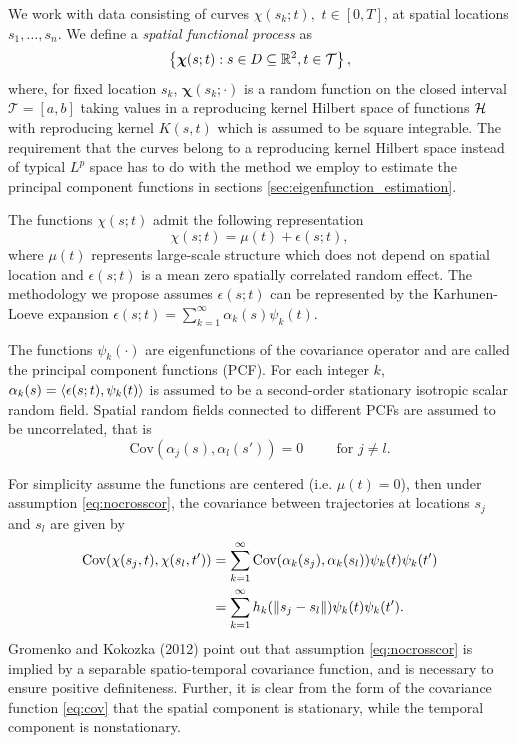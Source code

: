 \label{sec:statistical_model_for_spatially_indexed_functional_data}

We work with data consisting of curves $\chi(s_k; t),$ $t \in [0,T]$, at spatial locations $s_1, \dots, s_n$. We define a \emph{spatial functional process} as
\[ \left\{ \boldsymbol\chi(s; t): s \in D \subseteq  \mathbb{R} ^2, t \in \mathcal{T} \right\}, \]
where, for fixed location $s_k$, $\boldsymbol\chi(s_k; \cdot)$ is a random function on the closed interval $\mathcal{T} = [a,b]$ taking values in a reproducing kernel Hilbert space of functions $\mathcal{H}$ with reproducing kernel $K(s,t)$ which is assumed to be square integrable. The requirement that the curves belong to a reproducing kernel Hilbert space instead of typical $L^p$ space has to do with the method we employ to estimate the principal component functions in sections \ref{sec:eigenfunction_estimation}.

The functions $\chi(s;t)$ admit the following representation 
\begin{equation}
	\chi(s;t) = \mu(t) + \epsilon(s;t), 
\end{equation}
where $\mu(t)$ represents large-scale structure which does not depend on spatial location and $\epsilon(s;t)$ is a mean zero spatially correlated random effect. The methodology we propose assumes $\epsilon(s;t)$ can be represented by the Karhunen-Loeve expansion $\epsilon(s;t) = \sum_{k=1}^{\infty} \alpha_k(s)\psi_k(t)$.

The functions $\psi_k(\cdot)$ are eigenfunctions of the covariance operator and are called the principal component functions (PCF). For each integer $k$, $\alpha_k(s) = \langle \epsilon(s;t),  \psi_k(t) \rangle$ is assumed to be a second-order stationary isotropic scalar random field. Spatial random fields connected to different PCFs are assumed to be uncorrelated, that is 
\begin{equation}
	\text{Cov}(\alpha_j(s), \alpha_l(s')) = 0 \hspace{1cm} \text{for } j \neq l. \label{eq:nocrosscor} 
\end{equation}

For simplicity assume the functions are centered (i.e. $\mu(t)=0$), then under assumption \eqref{eq:nocrosscor}, the covariance between trajectories at locations $s_j$ and $s_l$ are given by 
\begin{align}
	\text{Cov}(\chi(s_j,t), \chi(s_l, t')) &= \sum_{k=1}^{\infty}\text{Cov}(\alpha_k(s_j), \alpha_k(s_l))\psi_k(t)\psi_k(t')\\
	&= \sum_{k=1}^{\infty}h_k(\left\|s_j-s_l\right\|)\psi_k(t)\psi_k(t'). \label{eq:cov} 
\end{align}
Gromenko and Kokozka (2012) point out that assumption \eqref{eq:nocrosscor} is implied by a separable spatio-temporal covariance function, and is necessary to ensure positive definiteness. Further, it is clear from the form of the covariance function \eqref{eq:cov} that the spatial component is stationary, while the temporal component is nonstationary.

